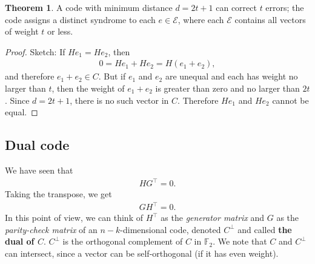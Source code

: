 \documentclass{article}
\theoremstyle{definition}
\newtheorem{thm}{Theorem}[section]
\begin{document}
\begin{thm}
	A code with minimum distance $d = 2t+1$ can correct $t$ errors; the code assigns a distinct syndrome to each $e \in \mathcal{E}$, where each $\mathcal{E}$ contains all vectors of weight $t$ or less. 
	
	\begin{proof}
		Sketch: If $He_1 = He_2$, then
		\begin{align}
		0 = He_1 + He_2 = H(e_1 + e_2),
		\end{align}
		and therefore $e_1 + e_2 \in C$. But if $e_1$ and $e_2$ are unequal and each has weight no larger than $t$, then the weight of $e_1 + e_2$ is greater than zero and no larger than $2t$. Since $d = 2t+1$, there is no such vector in $C$. Therefore $He_1$ and $He_2$ cannot be equal.
	\end{proof}
\end{thm}

\subsection{Dual code}
We have seen that 
\begin{align}
HG^\top = 0.
\end{align}
Taking the transpose, we get
\begin{align}
GH^\top = 0.
\end{align}
In this point of view, we can think of $H^\top$ as the \textit{generator matrix} and $G$ as the \textit{parity-check matrix} of an $n-k$-dimensional code, denoted $C^\perp$ and called \textbf{the dual of $C$}. $C^\perp$ is the orthogonal complement of $C$ in $\mathbb{F}_2$. We note that $C$ and $C^\perp$ can intersect, since a vector can be self-orthogonal (if it has even weight). \\
\end{document}
